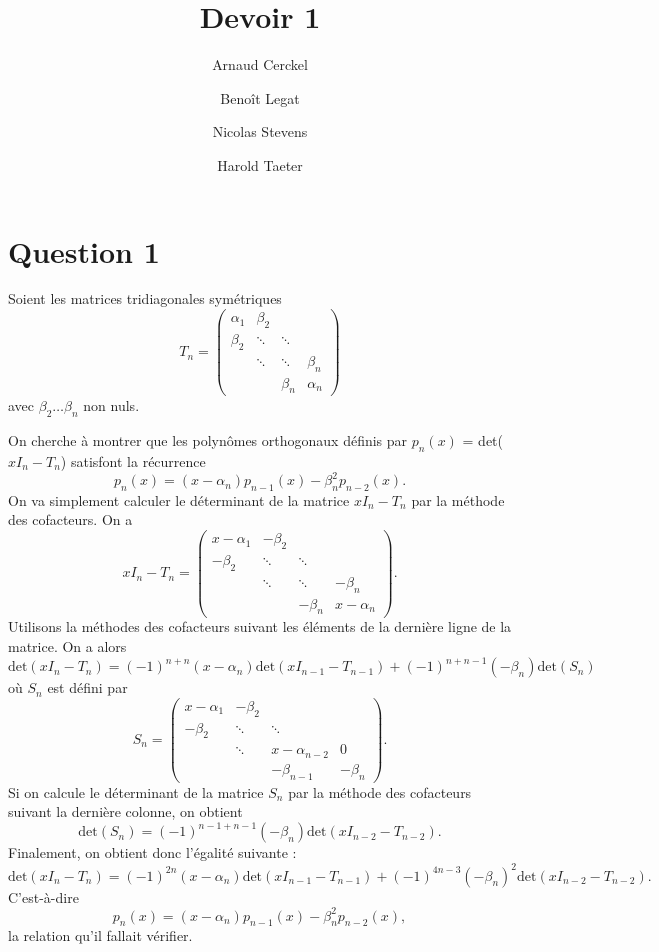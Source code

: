 \documentclass{article}
\title{Devoir 1}
\author{Arnaud Cerckel \and Benoît Legat \and
Nicolas Stevens \and Harold Taeter}
\begin{document}
\maketitle

\section*{Question 1}
Soient les matrices tridiagonales symétriques
$$T_n =
\begin{pmatrix}
\alpha_1 & \beta_2 & & \\
\beta_2 & \ddots & \ddots & \\
 & \ddots & \ddots & \beta_n \\
 & & \beta_n & \alpha_n
\end{pmatrix}
$$
avec $\beta_2 \hdots \beta_n$ non nuls.

On cherche à montrer que les polynômes orthogonaux définis par $p_n(x)$ = det($x I_n - T_n$) satisfont la récurrence $$p_n(x) = (x-\alpha_n)p_{n-1}(x) - \beta_n^2 p_{n-2}(x).$$
On va simplement calculer le déterminant de la matrice $x I_n - T_n$ par la méthode des cofacteurs. On a
$$x I_n - T_n =
\begin{pmatrix}
x-\alpha_1 & -\beta_2 & & \\
-\beta_2 & \ddots & \ddots & \\
 & \ddots & \ddots & -\beta_n \\
 & & -\beta_n & x-\alpha_n
\end{pmatrix}.
$$
Utilisons la méthodes des cofacteurs suivant les éléments de la dernière ligne de la matrice. On a alors $$\text{det}(x I_n - T_n) = (-1)^{n+n}(x-\alpha_n)\text{det}(x I_{n-1} - T_{n-1}) + (-1)^{n+n-1}(-\beta_n)\text{det}(S_n)$$ où $S_n$ est défini par
$$S_n =
\begin{pmatrix}
x-\alpha_1 & -\beta_2 & & \\
-\beta_2 & \ddots & \ddots & \\
 & \ddots & x-\alpha_{n-2} & 0 \\
 & & -\beta_{n-1} & -\beta_n
\end{pmatrix}.
$$
Si on calcule le déterminant de la matrice $S_n$ par la méthode des cofacteurs suivant la dernière colonne, on obtient $$\text{det}(S_n) = (-1)^{n-1+n-1}(-\beta_n)\text{det}(x I_{n-2} - T_{n-2}).$$
Finalement, on obtient donc l'égalité suivante : $$\text{det}(x I_n - T_n) = (-1)^{2n}(x-\alpha_n)\text{det}(x I_{n-1} - T_{n-1}) + (-1)^{4n-3}(-\beta_n)^2\text{det}(x I_{n-2} - T_{n-2}).$$
C'est-à-dire $$p_n(x) = (x-\alpha_n)p_{n-1}(x) - \beta_n^2 p_{n-2}(x),$$ la relation qu'il fallait vérifier.
\end{document}
